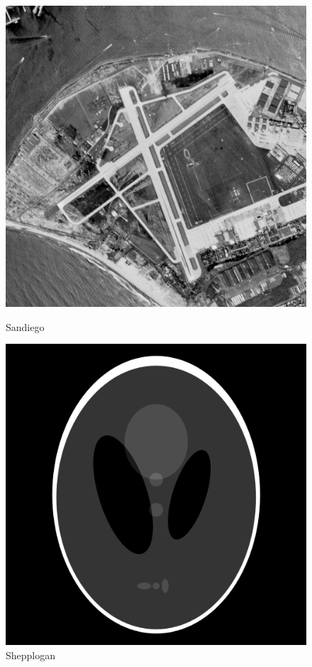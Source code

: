 \documentclass{article}
\begin{document}
    \phantom{}
    
    \begin{figure}[!htb]
      \includegraphics[scale=1.4]{../images/sandiego.png}
      \caption{Sandiego}
    \endminipage \hfill
      \includegraphics[scale=.35]{../images/shepplogan.png}
      \caption{Shepplogan}
    \endminipage
    \end{figure}
    \pagebreak
    
\end{document}
